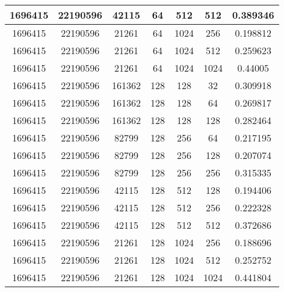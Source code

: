 \documentclass[9pt]{article}
\begin{document}
\begin{tabular}{|c|c|c|c|c|c|c| }
\hline
1696415  & 22190596  & 42115  & 64  & 512  & 512  & 0.389346 \\
\hline
1696415  & 22190596  & 21261  & 64  & 1024  & 256  & 0.198812 \\
\hline
1696415  & 22190596  & 21261  & 64  & 1024  & 512  & 0.259623 \\
\hline
1696415  & 22190596  & 21261  & 64  & 1024  & 1024  & 0.44005 \\
\hline
1696415  & 22190596  & 161362  & 128  & 128  & 32  & 0.309918 \\
\hline
1696415  & 22190596  & 161362  & 128  & 128  & 64  & 0.269817 \\
\hline
1696415  & 22190596  & 161362  & 128  & 128  & 128  & 0.282464 \\
\hline
1696415  & 22190596  & 82799  & 128  & 256  & 64  & 0.217195 \\
\hline
1696415  & 22190596  & 82799  & 128  & 256  & 128  & 0.207074 \\
\hline
1696415  & 22190596  & 82799  & 128  & 256  & 256  & 0.315335 \\
\hline
1696415  & 22190596  & 42115  & 128  & 512  & 128  & 0.194406 \\
\hline
1696415  & 22190596  & 42115  & 128  & 512  & 256  & 0.222328 \\
\hline
1696415  & 22190596  & 42115  & 128  & 512  & 512  & 0.372686 \\
\hline
1696415  & 22190596  & 21261  & 128  & 1024  & 256  & 0.188696 \\
\hline
1696415  & 22190596  & 21261  & 128  & 1024  & 512  & 0.252752 \\
\hline
1696415  & 22190596  & 21261  & 128  & 1024  & 1024  & 0.441804 \\
\hline
\end{tabular}
 
\end{document}
